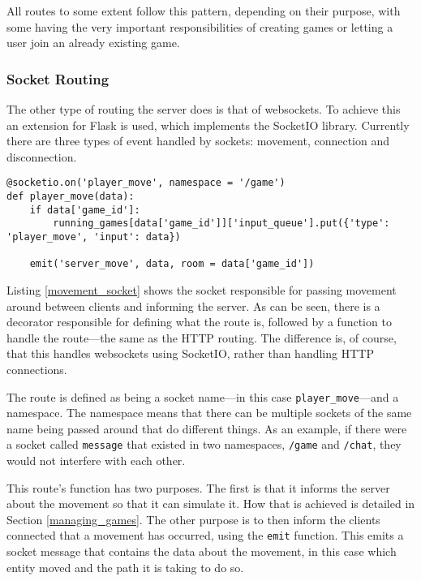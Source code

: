 All routes to some extent follow this pattern, depending on their purpose, with some having the very important responsibilities of creating games or letting a user join an already existing game.

\subsubsection{Socket Routing}
The other type of routing the server does is that of websockets. To achieve this an extension for Flask is used, which implements the SocketIO library. Currently there are three types of event handled by sockets: movement, connection and disconnection.

\noindent
\begin{minipage}{\linewidth}
\begin{lstlisting}[style=py, caption={Socket for passing movement events between clients and server.}, label=movement_socket]
@socketio.on('player_move', namespace = '/game')
def player_move(data):
    if data['game_id']:
        running_games[data['game_id']]['input_queue'].put({'type': 'player_move', 'input': data})

    emit('server_move', data, room = data['game_id'])
\end{lstlisting}
\end{minipage}

Listing \ref{movement_socket} shows the socket responsible for passing movement around between clients and informing the server. As can be seen, there is a decorator responsible for defining what the route is, followed by a function to handle the route---the same as the HTTP routing. The difference is, of course, that this handles websockets using SocketIO, rather than handling HTTP connections.

The route is defined as being a socket name---in this case \texttt{player\_move}---and a namespace. The namespace means that there can be multiple sockets of the same name being passed around that do different things. As an example, if there were a socket called \texttt{message} that existed in two namespaces, \texttt{/game} and \texttt{/chat}, they would not interfere with each other.

This route's function has two purposes. The first is that it informs the server about the movement so that it can simulate it. How that is achieved is detailed in Section \ref{managing_games}. The other purpose is to then inform the clients connected that a movement has occurred, using the \texttt{emit} function. This emits a socket message that contains the data about the movement, in this case which entity moved and the path it is taking to do so.

